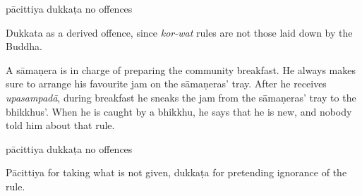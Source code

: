 \begin{exam}{\autoExamName}
\begin{problem*}
\begin{parts}
      \bigskip

      \begin{answers}{3}
        \bChoices
         pācittiya\eAns
         dukkaṭa\eAns
         no offences\eAns
        \eChoices
      \end{answers}

      \begin{solution}
        Dukkata as a derived offence, since \emph{kor-wat} rules are not those laid down by the Buddha.
      \end{solution}

      \bigskip

      \item A sāmaṇera is in charge of preparing the community breakfast. He
      always makes sure to arrange his favourite jam on the sāmaṇeras' tray.
      After he receives \emph{upasampadā}, during breakfast he sneaks the jam
      from the sāmaṇeras' tray to the bhikkhus'. When he is caught by a bhikkhu,
      he says that he is new, and nobody told him about that rule.

      \bigskip

      \begin{answers}{3}
        \bChoices
         pācittiya\eAns
         dukkaṭa\eAns
         no offences\eAns
        \eChoices
      \end{answers}

      \begin{solution}
        Pācittiya for taking what is not given, dukkaṭa for pretending ignorance
        of the rule.
      \end{solution}

    \end{parts}

  \end{problem*}

\end{exam}
